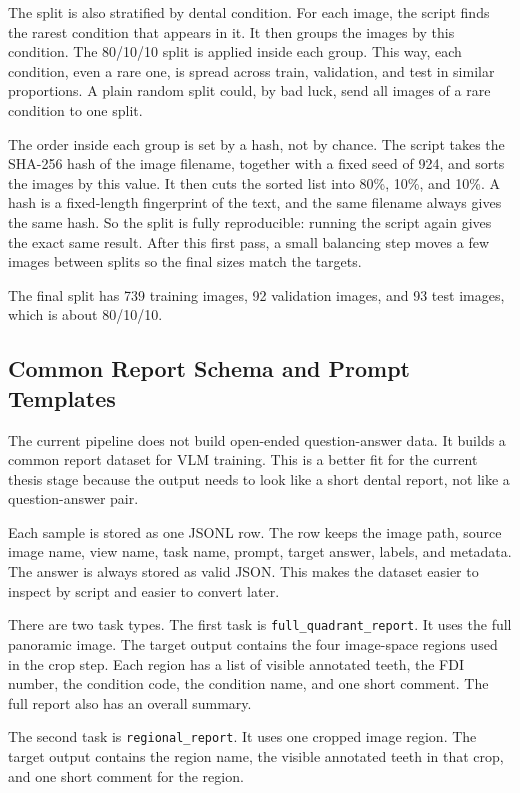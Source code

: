 \documentclass[a4paper,12pt]{report}
\begin{document}
The split is also stratified by dental condition. For each image, the script finds the rarest condition that appears in it. It then groups the images by this condition. The 80/10/10 split is applied inside each group. This way, each condition, even a rare one, is spread across train, validation, and test in similar proportions. A plain random split could, by bad luck, send all images of a rare condition to one split.

The order inside each group is set by a hash, not by chance. The script takes the SHA-256 hash of the image filename, together with a fixed seed of 924, and sorts the images by this value. It then cuts the sorted list into 80\%, 10\%, and 10\%. A hash is a fixed-length fingerprint of the text, and the same filename always gives the same hash. So the split is fully reproducible: running the script again gives the exact same result. After this first pass, a small balancing step moves a few images between splits so the final sizes match the targets.

The final split has 739 training images, 92 validation images, and 93 test images, which is about 80/10/10.

\subsection{Common Report Schema and Prompt Templates}

The current pipeline does not build open-ended question-answer data. It builds a common report dataset for VLM training. This is a better fit for the current thesis stage because the output needs to look like a short dental report, not like a question-answer pair.

Each sample is stored as one JSONL row. The row keeps the image path, source image name, view name, task name, prompt, target answer, labels, and metadata. The answer is always stored as valid JSON. This makes the dataset easier to inspect by script and easier to convert later.

There are two task types. The first task is \texttt{full\_quadrant\_report}. It uses the full panoramic image. The target output contains the four image-space regions used in the crop step. Each region has a list of visible annotated teeth, the FDI number, the condition code, the condition name, and one short comment. The full report also has an overall summary.

The second task is \texttt{regional\_report}. It uses one cropped image region. The target output contains the region name, the visible annotated teeth in that crop, and one short comment for the region.
\end{document}
